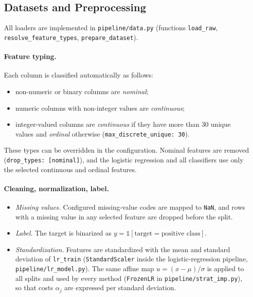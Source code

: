 \subsection{Datasets and Preprocessing}
\label{app:data}

All loaders are implemented in \texttt{pipeline/data.py} (functions
\texttt{load\_raw}, \texttt{resolve\_feature\_types},
\texttt{prepare\_dataset}).

\paragraph{Feature typing.}
Each column is classified automatically as follows:
\begin{itemize}
  \item non-numeric or binary columns are \emph{nominal};
  \item numeric columns with non-integer values are \emph{continuous};
  \item integer-valued columns are \emph{continuous} if they have more than 30
        unique values and \emph{ordinal} otherwise (\texttt{max\_discrete\_unique: 30}).
\end{itemize}
These types can be overridden in the configuration. Nominal features are
removed (\texttt{drop\_types: [nominal]}), and the logistic regression and all
classifiers use only the selected continuous and ordinal features.

\paragraph{Cleaning, normalization, label.}
\begin{itemize}
  \item \emph{Missing values.} Configured missing-value codes are mapped to
        \texttt{NaN}, and rows with a missing value in any selected feature are
        dropped before the split.
  \item \emph{Label.} The target is binarized as $y=\mathbb{1}[\text{target}=\text{positive class}]$.
  \item \emph{Standardization.} Features are standardized with the mean and
        standard deviation of \texttt{lr\_train} (\texttt{StandardScaler} inside
        the logistic-regression pipeline, \texttt{pipeline/lr\_model.py}). The
        same affine map $u=(x-\mu)/\sigma$ is applied to all splits and used by
        every method (\texttt{FrozenLR} in \texttt{pipeline/strat\_imp.py}), so
        that costs $\alpha_j$ are expressed per standard deviation.
\end{itemize}

